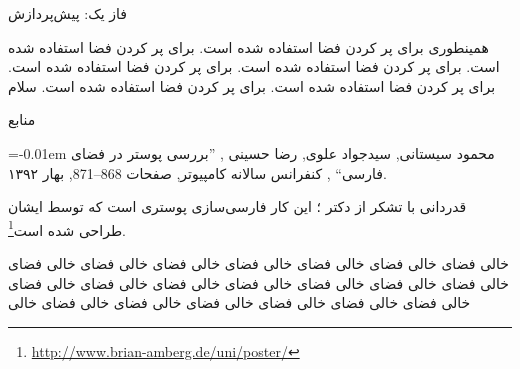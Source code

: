 \documentclass[debug,a0paper,portrait]{xebaposter}
\begin{document}
\begin{poster}
\begin{posterbox}[name=phase1,column=0,span=1,below=imagedataset]{فاز یک{:} پیش‌پردازش}
\ptext[16-17]
\end{posterbox}
\begin{posterbox}[name=adhoc,column=0,span=1,below=phase1]{همینطوری}
{برای پر کردن فضا استفاده شده است. برای پر کردن فضا استفاده شده است. برای پر کردن فضا استفاده شده است. 
برای پر کردن فضا استفاده شده است. برای پر کردن فضا استفاده شده است. برای پر کردن فضا استفاده شده است. 
سلام}
\end{posterbox}
\begin{posterbox}[name=references,column=1,span=2,below=results]{منابع}
     \smaller
%     
     \renewcommand{\section}[2]{\vskip 0.05em}
       \begin{thebibliography}{1}\itemsep=-0.01em
       \setlength{\baselineskip}{0.4em}
       \bibitem{}
       محمود سیستانی, سیدجواد علوی, رضا حسینی
	, ''بررسی پوستر در فضای فارسی``
	, کنفرانس سالانه کامپیوتر, صفحات 868--871, بهار ۱۳۹۲.
       \end{thebibliography}
\end{posterbox}
\begin{posterbox}[name=ack,column=0,span=2,below=references]{قدردانی}
با تشکر از دکتر ؛ این کار فارسی‌سازی پوستری است که توسط ایشان طراحی شده است\footnote{\url{http://www.brian-amberg.de/uni/poster/}}.
\end{posterbox}
\begin{posterbox}[name=ack,column=2,span=1,below=references]{خالی}
فضای خالی فضای خالی فضای خالی فضای خالی فضای خالی فضای خالی فضای خالی فضای خالی فضای خالی فضای خالی 
فضای خالی فضای خالی فضای خالی فضای خالی فضای خالی فضای خالی فضای خالی فضای خالی فضای خالی فضای خالی 
\end{posterbox}%
\end{poster}
\end{document}
